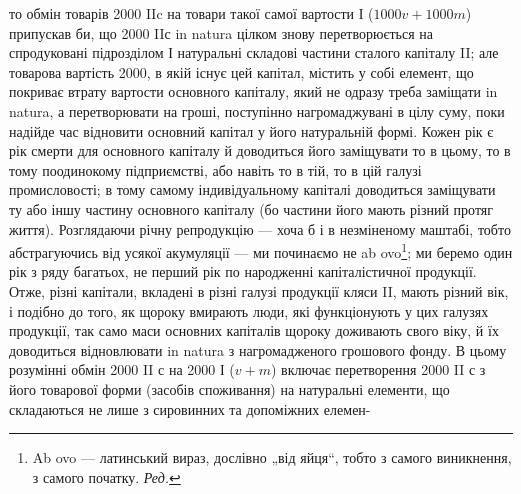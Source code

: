 то обмін товарів 2000 IIc на товари такої самої вартости І ($1000 v +
1000 m$) припускав би, що 2000 IIс in natura цілком знову перетворюється
на спродуковані підрозділом І натуральні складові частини сталого
капіталу II; але товарова вартість 2000, в якій існує цей капітал,
містить у собі елемент, що покриває втрату вартости основного капіталу,
який не одразу треба заміщати in natura, а перетворювати на гроші, поступінно
нагромаджувані в цілу суму, поки надійде час відновити
основний капітал у його натуральній формі. Кожен рік є рік смерти для
основного капіталу й доводиться його заміщувати то в цьому, то в тому
поодинокому підприємстві, або навіть то в тій, то в цій галузі промисловості;
в тому самому індивідуальному капіталі доводиться заміщувати
ту або іншу частину основного капіталу (бо частини його мають різний
протяг життя). Розглядаючи річну репродукцію — хоча б і в незміненому
маштабі, тобто абстрагуючись від усякої акумуляції — ми починаємо не
ab ovo\footnote*{
Ab ovo — латинський вираз, дослівно „від яйця“, тобто з самого виникнення,
з самого початку. \emph{Ред.}
}; ми беремо один рік з ряду багатьох, не перший рік по
народженні капіталістичної продукції. Отже, різні капітали, вкладені
в різні галузі продукції кляси II, мають різний вік, і подібно до того,
як щороку вмирають люди, які функціонують у цих галузях продукції,
так само маси основних капіталів щороку доживають свого віку, й їх доводиться
відновлювати in natura з нагромадженого грошового фонду. В
цьому розумінні обмін 2000 II с на 2000 І ($v + m$) включає перетворення
2000 II с з його товарової форми (засобів споживання) на натуральні
елементи, що складаються не лише з сировинних та допоміжних елемен-
\parbreak{}  %
